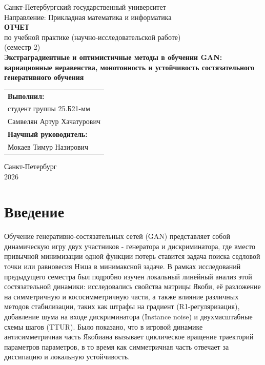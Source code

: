 \documentclass[12pt,a4paper]{article}
\begin{document}
	

	\begin{titlepage}
		\begin{center}
			{\large Санкт-Петербургский государственный университет}\\[0.5cm]
			{\large Направление: Прикладная математика и информатика}\\[4.5cm]
			
			{\Large \bfseries ОТЧЕТ}\\[0.3cm]
			{\large по учебной практике (научно-исследовательской работе)}\\[0.3cm]
			{\large (семестр 2)}\\[2.5cm]
			
			{\Large \bfseries Экстраградиентные и оптимистичные методы в
				обучении GAN:
				вариационные неравенства, монотонность и устойчивость
				состязательного генеративного обучения}\\[4.5cm]
		\end{center}
		
		\begin{flushright}
			\begin{tabular}{l}
				\textbf{Выполнил:}\\
				студент группы 25.Б21-мм\\
				Самвелян Артур Хачатурович\\[0.8cm]
				\textbf{Научный руководитель:}\\
				Мокаев Тимур Назирович
			\end{tabular}
		\end{flushright}
		
		\vfill
		
		\begin{center}
			Санкт-Петербург\\
			2026
		\end{center}
	\end{titlepage}
	

	\newpage
	\tableofcontents
	\newpage
	

	
	\section{Введение}
	
	Обучение генеративно-состязательных сетей (GAN) представляет собой динамическую игру двух участников - генератора и дискриминатора, где вместо привычной минимизации одной функции потерь ставится задача поиска седловой точки или равновесия Нэша в минимаксной задаче. В рамках исследований предыдущего семестра был подробно изучен локальный линейный анализ этой состязательной динамики: исследовались свойства матрицы Якоби, её разложение на симметричную и кососимметричную части, а также влияние различных методов стабилизации, таких как штрафы на градиент (R1-регуляризация), добавление шума на входе дискриминатора (Instance noise) и двухмасштабные схемы шагов (TTUR). Было показано, что в игровой динамике антисимметричная часть Якобиана вызывает циклическое вращение траекторий параметров параметров, в то время как симметричная часть отвечает за диссипацию и локальную устойчивость.
	
\end{document}
